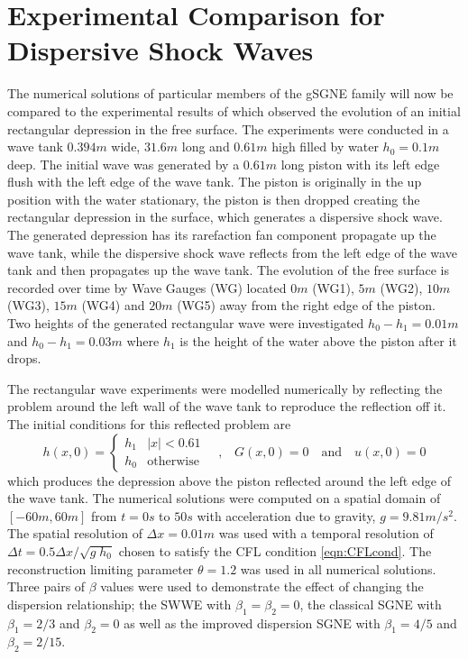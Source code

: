 \documentclass[10pt]{elsarticle}
\begin{document}
\section{Experimental Comparison for Dispersive Shock Waves}

The numerical solutions of particular members of the gSGNE family will now be compared to the experimental results of \citet{Hammack-Segur-1978-337} which observed the evolution of an initial rectangular depression in the free surface. The experiments were conducted in a wave tank $0.394m$ wide, $31.6m$ long and $0.61m$ high filled by water $h_0 = 0.1m$ deep. The initial wave was generated by a $0.61m$ long piston with its left edge flush with the left edge of the wave tank. The piston is originally in the up position with the water stationary, the piston is then dropped creating the rectangular depression in the surface, which generates a dispersive shock wave. The generated depression has its rarefaction fan component propagate up the wave tank, while the dispersive shock wave reflects from the left edge of the wave tank and then propagates up the wave tank. The evolution of the free surface is recorded over time by Wave Gauges (WG) located $0m$ (WG1), $5m$ (WG2), $10m$ (WG3), $15m$ (WG4) and $20m$ (WG5) away from the right edge of the piston. Two heights of the generated rectangular wave were investigated $h_0 - h_1 = 0.01m$ and $h_0 - h_1 = 0.03m$ where $h_1$ is the height of the water above the piston after it drops.

The rectangular wave experiments were modelled numerically by reflecting the problem around the left wall of the wave tank to reproduce the reflection off it. The initial conditions for this reflected problem are
\begin{equation*}
h(x,0) = \begin{cases}
	h_1 &  |x| < 0.61 \\
	h_0 & \text{otherwise}
\end{cases}
\quad
\text{,}
\quad
G(x,0) = 0
\quad
\text{and}
\quad
u(x,0) = 0
\end{equation*}
which produces the depression above the piston reflected around the left edge of the wave tank. The numerical solutions were computed on a spatial domain of $[-60m,60m]$ from $t = 0 s$ to $50s$ with acceleration due to gravity, $g = 9.81m/s^2$. The spatial resolution of $\Delta x = 0.01m$ was used with a temporal resolution of $\Delta t = 0.5 \Delta x / \sqrt{g \; h_0}$ chosen to satisfy the CFL condition \eqref{eqn:CFLcond}. The reconstruction limiting parameter $\theta = 1.2$ was used in all numerical solutions. Three pairs of $\beta$ values were used to demonstrate the effect of changing the dispersion relationship; the SWWE with $\beta_1=\beta_2=0$, the classical SGNE with $\beta_1=2/3$ and $\beta_2=0$ as well as the improved dispersion SGNE with  $\beta_1=4/5$ and $\beta_2=2/15$.
\end{document}
